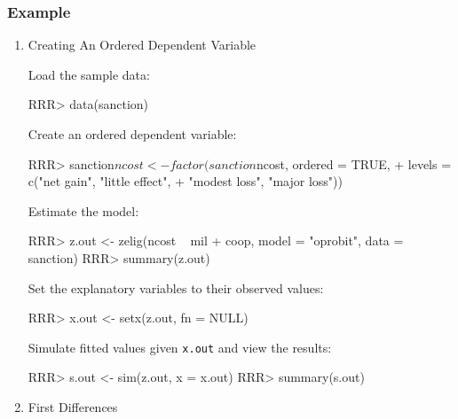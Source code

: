 \subsubsection{Example}
\begin{enumerate}
\item {Creating An Ordered Dependent Variable} \label{ord.fact.p}

Load the sample data:  
\begin{Schunk}
\begin{Sinput}
RRR>  data(sanction)
\end{Sinput}
\end{Schunk}
Create an ordered dependent variable: 
\begin{Schunk}
\begin{Sinput}
RRR>  sanction$ncost <- factor(sanction$ncost, ordered = TRUE,
+                            levels = c("net gain", "little effect", 
+                            "modest loss", "major loss"))
\end{Sinput}
\end{Schunk}
Estimate the model:
\begin{Schunk}
\begin{Sinput}
RRR>  z.out <- zelig(ncost ~ mil + coop, model = "oprobit", data = sanction)
RRR>  summary(z.out)
\end{Sinput}
\end{Schunk}
Set the explanatory variables to their observed values:  
\begin{Schunk}
\begin{Sinput}
RRR>  x.out <- setx(z.out, fn = NULL)
\end{Sinput}
\end{Schunk}
Simulate fitted values given {\tt x.out} and view the results:
\begin{Schunk}
\begin{Sinput}
RRR>  s.out <- sim(z.out, x = x.out)
RRR>  summary(s.out)
\end{Sinput}
\end{Schunk}

\item {First Differences}


\end{enumerate}
